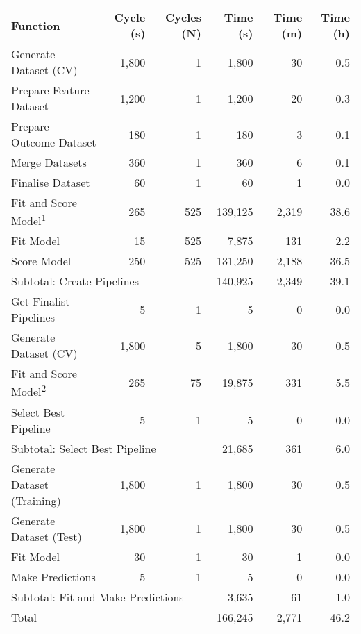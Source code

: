 \newcommand{\sub}[1]{\hspace{1em}#1}

\begin{tabular}{lrrrrr} \toprule
Function & Cycle (s) & Cycles (N) & Time (s)   & Time (m) & Time (h) \\ \midrule
Generate Dataset (CV)             & 1,800 & 1 & 1,800 & 30 & 0.5 \\
\sub{Prepare Feature Dataset}     & 1,200 & 1 & 1,200 & 20 & 0.3 \\
\sub{Prepare Outcome Dataset}     & 180 & 1 & 180 & 3 & 0.1 \\
\sub{Merge Datasets}              & 360 & 1 & 360 & 6 & 0.1 \\
\sub{Finalise Dataset}            & 60 & 1 & 60 & 1 & 0.0 \\
Fit and Score Model\textsuperscript{1} & 265 & 525 & 139,125 & 2,319 & 38.6 \\
\sub{Fit Model}                   & 15 & 525 & 7,875 & 131 & 2.2 \\
\sub{Score Model}                 & 250 & 525 & 131,250 & 2,188 & 36.5 \\ \midrule
\multicolumn{3}{l}{Subtotal: Create Pipelines} & 140,925 & 2,349 & 39.1 \\ \midrule
Get Finalist Pipelines            & 5 & 1 & 5 & 0 & 0.0 \\
Generate Dataset (CV)             & 1,800 & 5 & 1,800 & 30 & 0.5 \\
Fit and Score Model\textsuperscript{2} & 265 & 75 & 19,875 & 331 & 5.5 \\
Select Best Pipeline              & 5 & 1 & 5 & 0 & 0.0 \\ \midrule
\multicolumn{3}{l}{Subtotal: Select Best Pipeline} & 21,685 & 361 & 6.0 \\ \midrule
Generate Dataset (Training)       & 1,800 & 1 & 1,800 & 30 & 0.5 \\
Generate Dataset (Test)           & 1,800 & 1 & 1,800 & 30 & 0.5 \\
Fit Model                         & 30 & 1 & 30 & 1 & 0.0 \\
Make Predictions                  & 5 & 1 & 5 & 0 & 0.0 \\ \midrule
\multicolumn{3}{l}{Subtotal: Fit and Make Predictions} & 3,635 & 61 & 1.0 \\ \midrule
\multicolumn{3}{l}{Total}        & 166,245 & 2,771 & 46.2 \\
\bottomrule \end{tabular}
